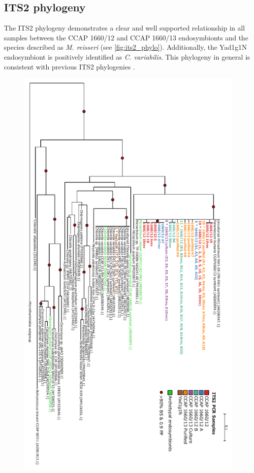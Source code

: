 \subsection{ITS2 phylogeny}

The ITS2 phylogeny demonstrates a clear and well supported relationship in all samples 
between the CCAP 1660/12 and CCAP 1660/13 endosymbionts and the species described as 
\textit{M. reisseri} (see \cref{fig:its2_phylo}).  Additionally,
the Yad1g1N endosymbiont is positively identified as \textit{C. variabilis}. 
This phylogeny in general is consistent with previous ITS2 phylogenies \citep{Hoshina2010}.

\begin{figure}
    \centering
    \includegraphics[height=0.8\textheight]{its_phylo.pdf}

\end{figure}

